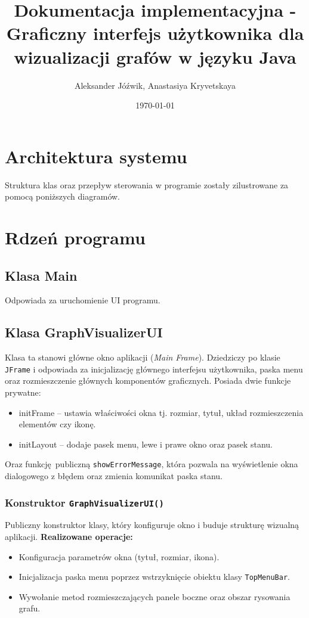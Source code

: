 \documentclass[]{article}
\title{Dokumentacja implementacyjna - Graficzny interfejs użytkownika dla wizualizacji grafów w języku Java}
\author{\authoricon Aleksander Jóźwik, Anastasiya Kryvetskaya}
\date{\dateicon \today}
\begin{document}
	\noindent
	\maketitle

	\tableofcontents
	\clearpage

    \section{Architektura systemu}
    Struktura klas oraz przepływ sterowania w programie zostały zilustrowane za pomocą poniższych diagramów. 



    \clearpage

    \section{Rdzeń programu}

    \subsection{Klasa  Main}
    Odpowiada za uruchomienie UI programu.
    \subsection{Klasa GraphVisualizerUI}
    Klasa ta stanowi główne okno aplikacji (\textit{Main Frame}). Dziedziczy po klasie \texttt{JFrame} i odpowiada za inicjalizację głównego interfejsu użytkownika, paska menu oraz rozmieszczenie głównych komponentów graficznych. Posiada dwie funkcje prywatne:
    \begin{itemize}
        \item initFrame -- ustawia właściwości okna tj. rozmiar, tytuł, układ rozmieszczenia elementów czy ikonę.
        \item initLayout -- dodaje pasek menu, lewe i prawe okno oraz pasek stanu.
    \end{itemize}
    Oraz funkcję publiczną \texttt{showErrorMessage}, która pozwala na wyświetlenie okna dialogowego z błędem oraz zmienia komunikat paska stanu.

    \subsubsection{Konstruktor \texttt{GraphVisualizerUI()}}
    Publiczny konstruktor klasy, który konfiguruje okno i buduje strukturę wizualną aplikacji.
    \textbf{Realizowane operacje:}
    \begin{itemize}
    \item Konfiguracja parametrów okna (tytuł, rozmiar, ikona).
    \item Inicjalizacja paska menu poprzez wstrzyknięcie obiektu klasy \texttt{TopMenuBar}.
    \item Wywołanie metod rozmieszczających panele boczne oraz obszar rysowania grafu.
    \end{itemize}
\end{document}
